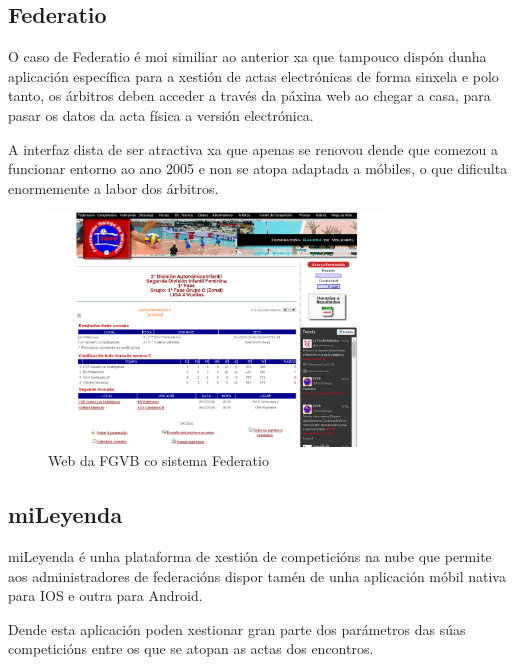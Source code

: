 \clearpage

    \subsection{Federatio}

    O caso de Federatio é moi similiar ao anterior xa que tampouco dispón dunha 
aplicación específica para a xestión de actas electrónicas de forma sinxela e polo tanto, 
os árbitros deben acceder a través da páxina web ao chegar a casa, para pasar os datos da 
acta física a versión electrónica.

    A interfaz dista de ser atractiva xa que apenas se renovou dende que comezou a 
funcionar entorno ao ano 2005 e non se atopa adaptada a móbiles, o que dificulta 
enormemente a labor dos árbitros.


      \begin{figure}[h!]
	\begin{center}
	  \includegraphics[width=0.8\textwidth]{./img/federatio-app.png}
	  \caption{Web da FGVB co sistema Federatio}
	\end{center}
      \end{figure}

\clearpage

    \subsection{miLeyenda}
  
    miLeyenda é unha plataforma de xestión de competicións na nube que permite 
aos administradores de federacións dispor tamén de unha aplicación móbil nativa 
para IOS e outra para Android.
    
    Dende esta aplicación poden xestionar gran parte dos parámetros das súas competicións 
entre os que se atopan as actas dos encontros.
  
